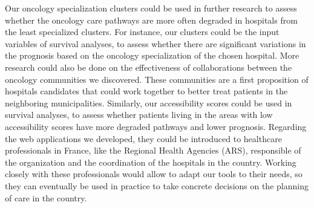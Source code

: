 Our oncology specialization clusters could be used in further research to assess
whether the oncology care pathways are more often degraded in hospitals from the
least specialized clusters. For instance, our clusters could be the input
variables of survival analyses, to assess whether there are significant
variations in the prognosis based on the oncology specialization of the chosen
hospital. More research could also be done on the effectiveness of
collaborations between the oncology communities we discovered. These communities
are a first proposition of hospitals candidates that could work together to
better treat patients in the neighboring municipalities. Similarly, our
accessibility scores could be used in survival analyses, to assess whether
patients living in the areas with low accessibility scores have more degraded
pathways and lower prognosis. Regarding the web applications we developed,
they could be introduced to healthcare professionals in France, like the
Regional Health Agencies (ARS), responsible of the organization and the
coordination of the hospitals in the country. Working closely with these
professionals would allow to adapt our tools to their needs, so they can
eventually be used in practice to take concrete decisions on the planning of
care in the country.